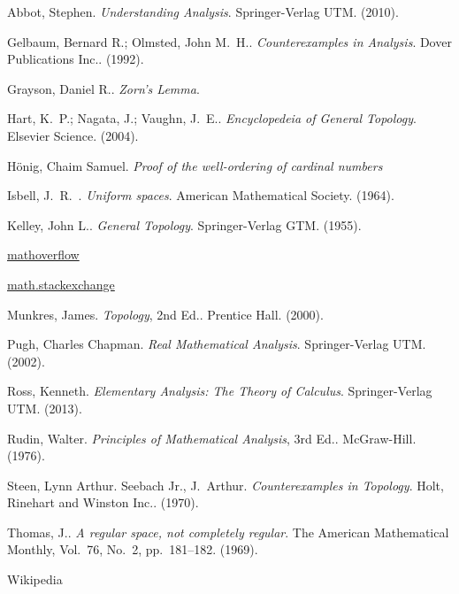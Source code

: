 \begin{thebibliography}{9}

Abbot, Stephen.  \textit{Understanding Analysis}.  Springer-Verlag UTM.  (2010).

Gelbaum, Bernard R.; Olmsted, John M.~H..  \textit{Counterexamples in Analysis}.  Dover Publications Inc..  (1992).

Grayson, Daniel R..  \textit{Zorn's Lemma}.

Hart, K.~P.; Nagata, J.; Vaughn, J.~E..  \textit{Encyclopedeia of General Topology}.  Elsevier Science.  (2004).

H\"{o}nig, Chaim Samuel.  \textit{Proof of the well-ordering of cardinal numbers}

Isbell, J.~R.~.  \textit{Uniform spaces}.  American Mathematical Society.  (1964).

Kelley, John L..  \textit{General Topology}.  Springer-Verlag GTM.  (1955).

\href{http://mathoverflow.net/}{mathoverflow}

\href{http://math.stackexchange.com/}{math.stackexchange}

Munkres, James.  \textit{Topology}, 2nd Ed..  Prentice Hall.  (2000).

Pugh, Charles Chapman.  \textit{Real Mathematical Analysis}.  Springer-Verlag UTM.  (2002).

Ross, Kenneth.  \textit{Elementary Analysis:  The Theory of Calculus}.  Springer-Verlag UTM.  (2013).

Rudin, Walter.  \textit{Principles of Mathematical Analysis}, 3rd Ed..  McGraw-Hill.  (1976).

Steen, Lynn Arthur.  Seebach Jr., J.~Arthur.  \textit{Counterexamples in Topology}.  Holt, Rinehart and Winston Inc..  (1970).

Thomas, J..  \textit{A regular space, not completely regular}.  The American Mathematical Monthly, Vol.~76, No.~2, pp.~181--182.  (1969).

Wikipedia

\end{thebibliography}